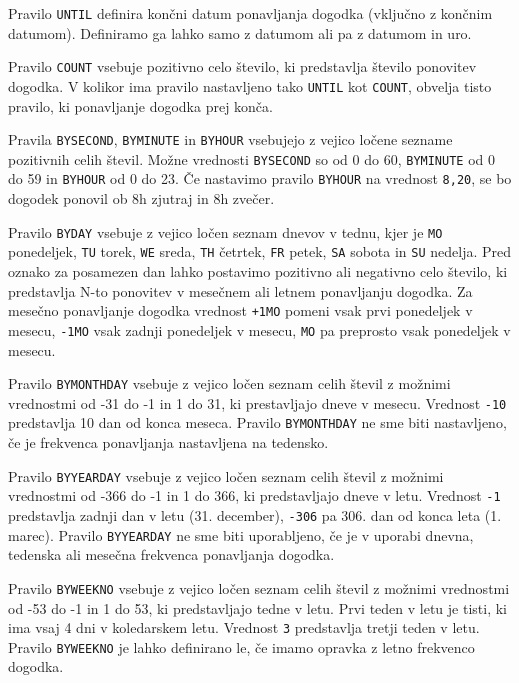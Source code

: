 Pravilo \texttt{UNTIL} definira končni datum ponavljanja dogodka (vključno z končnim datumom). Definiramo ga lahko samo z datumom ali pa z datumom in uro.

Pravilo \texttt{COUNT} vsebuje pozitivno celo število, ki predstavlja število ponovitev dogodka. V kolikor ima pravilo nastavljeno tako \texttt{UNTIL} kot \texttt{COUNT}, obvelja tisto pravilo, ki ponavljanje dogodka prej konča.

Pravila \texttt{BYSECOND}, \texttt{BYMINUTE} in \texttt{BYHOUR} vsebujejo z vejico ločene sezname pozitivnih celih števil. Možne vrednosti \texttt{BYSECOND} so od 0 do 60, \texttt{BYMINUTE} od 0 do 59 in \texttt{BYHOUR} od 0 do 23. Če nastavimo pravilo \texttt{BYHOUR} na vrednost \texttt{8,20}, se bo dogodek ponovil ob 8h zjutraj in 8h zvečer.

Pravilo \texttt{BYDAY} vsebuje z vejico ločen seznam dnevov v tednu, kjer je \texttt{MO} ponedeljek, \texttt{TU} torek, \texttt{WE} sreda, \texttt{TH} četrtek, \texttt{FR} petek, \texttt{SA} sobota in \texttt{SU} nedelja. Pred oznako za posamezen dan lahko postavimo pozitivno ali negativno celo število, ki predstavlja N-to ponovitev v mesečnem ali letnem ponavljanju dogodka. Za mesečno ponavljanje dogodka vrednost \texttt{+1MO} pomeni vsak prvi ponedeljek v mesecu, \texttt{-1MO} vsak zadnji ponedeljek v mesecu, \texttt{MO} pa preprosto vsak ponedeljek v mesecu.

Pravilo \texttt{BYMONTHDAY} vsebuje z vejico ločen seznam celih števil z možnimi vrednostmi od -31 do -1 in 1 do 31, ki prestavljajo dneve v mesecu. Vrednost \texttt{-10} predstavlja 10 dan od konca meseca. Pravilo \texttt{BYMONTHDAY} ne sme biti nastavljeno, če je frekvenca ponavljanja nastavljena na tedensko.

Pravilo \texttt{BYYEARDAY} vsebuje z vejico ločen seznam celih števil z možnimi vrednostmi od -366 do -1 in 1 do 366, ki predstavljajo dneve v letu. Vrednost \texttt{-1} predstavlja zadnji dan v letu (31. december), \texttt{-306} pa 306. dan od konca leta (1. marec). Pravilo \texttt{BYYEARDAY} ne sme biti uporabljeno, če je v uporabi dnevna, tedenska ali mesečna frekvenca ponavljanja dogodka.

Pravilo \texttt{BYWEEKNO} vsebuje z vejico ločen seznam celih števil z možnimi vrednostmi od -53 do -1 in 1 do 53, ki predstavljajo tedne v letu. Prvi teden v letu je tisti, ki ima vsaj 4 dni v koledarskem letu. Vrednost \texttt{3} predstavlja tretji teden v letu. Pravilo \texttt{BYWEEKNO} je lahko definirano le, če imamo opravka z letno frekvenco dogodka.


